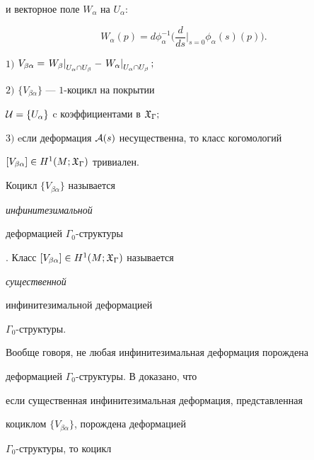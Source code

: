 и векторное поле $W_\alpha$ на $U_\alpha$:


\begin{equation}\label{eq9}


W_\alpha(p) = d\phi_\alpha^{-1} \bigg(\frac{d}{ds}\Big|_{s=0}


\phi_\alpha(s)(p) \bigg).


\end{equation}





\begin{stat}\label{st2}





$1)$ $V_{\beta\alpha}=\rest{W_\beta}{U_\alpha \cap U_\beta}-


\rest{W_\alpha}{U_\alpha \cap U_\beta};$





$2)$ $\{V_{\beta\alpha}\}$ --- $1$-коцикл на покрытии


${\cal U}=\{U_\alpha\}$ c коэффициентами в ${\frak X}_{\Gamma};$





$3)$ eсли деформация ${\cal A}(s)$ несущественна, то класс когомологий


$[V_{\beta\alpha}] \in H^1(M; {\frak X}_{\Gamma})$ тривиален.


\end{stat}





Коцикл $\{V_{\beta\alpha}\}$ называется {\em инфинитезимальной


деформацией $\Gamma_0$-структуры}. Класс $[V_{\beta\alpha}] \in


H^1(M; \gX_\Gamma)$ называется {\em существенной


инфинитезимальной деформацией}


$\Gamma_0$-структуры.





Вообще говоря, не любая инфинитезимальная деформация порождена


деформацией $\Gamma_0$-структуры. В \cite{Kodaira} доказано, что


если существенная инфинитезимальная деформация, представленная


коциклом $\{V_{\beta\alpha}\}$, порождена деформацией


$\Gamma_0$-структуры, то коцикл


